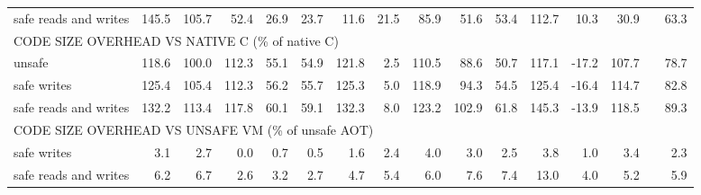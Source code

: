 \begin{landscape}
\begin{table}[t!]
\begin{tabular}{lrrrrrrrrrrrrrrr}
    safe reads and writes               &      145.5 &      105.7 &       52.4 &       26.9 &       23.7 &       11.6 &       21.5 &       85.9 &       51.6 &       53.4 &      112.7 &       10.3 &       30.9 &                   &      63.3 \\
    \multicolumn{10}{l}{CODE SIZE OVERHEAD VS NATIVE C (\% of native C)} \\
    unsafe                              &      118.6 &      100.0 &      112.3 &       55.1 &       54.9 &      121.8 &        2.5 &      110.5 &       88.6 &       50.7 &      117.1 &      -17.2 &      107.7 &                   &      78.7 \\
    safe writes                         &      125.4 &      105.4 &      112.3 &       56.2 &       55.7 &      125.3 &        5.0 &      118.9 &       94.3 &       54.5 &      125.4 &      -16.4 &      114.7 &                   &      82.8 \\
    safe reads and writes               &      132.2 &      113.4 &      117.8 &       60.1 &       59.1 &      132.3 &        8.0 &      123.2 &      102.9 &       61.8 &      145.3 &      -13.9 &      118.5 &                   &      89.3 \\
    \multicolumn{10}{l}{CODE SIZE OVERHEAD VS UNSAFE VM (\% of unsafe AOT)} \\
    safe writes                         &        3.1 &        2.7 &        0.0 &        0.7 &        0.5 &        1.6 &        2.4 &        4.0 &        3.0 &        2.5 &        3.8 &        1.0 &        3.4 &                   &       2.3 \\
    safe reads and writes               &        6.2 &        6.7 &        2.6 &        3.2 &        2.7 &        4.7 &        5.4 &        6.0 &        7.6 &        7.4 &       13.0 &        4.0 &        5.2 &                   &       5.9 \\
    \bottomrule
    \end{tabular}
\end{table}
\end{landscape}
\clearpage
\restoregeometry
